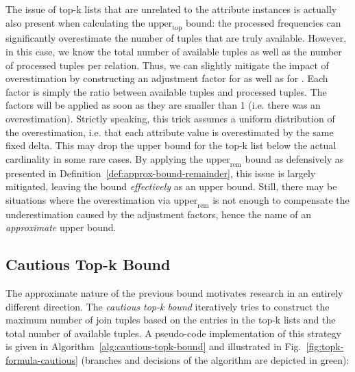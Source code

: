 The issue of top-k lists that are unrelated to the attribute instances is actually also present when calculating the $\text{upper}_\text{top}$ bound: the processed frequencies can significantly overestimate the number of tuples that are truly available. 
However, in this case, we know the total number of available tuples as well as the number of processed tuples per relation. 
Thus, we can slightly mitigate the impact of overestimation by constructing an adjustment factor for  as well as for . 
Each factor is simply the ratio between available tuples and processed tuples. 
The factors will be applied as soon as they are smaller than 1 (i.e. there was an overestimation). 
Strictly speaking, this trick assumes a uniform distribution of the overestimation, i.e. that each attribute value is overestimated by the same fixed delta. 
This may drop the upper bound for the top-k list below the actual cardinality in some rare cases. 
By applying the $\text{upper}_\text{rem}$ bound as defensively as presented in Definition~\ref{def:approx-bound-remainder}, this issue is largely mitigated, leaving the bound \emph{effectively} as an upper bound. 
Still, there may be situations where the overestimation via $\text{upper}_\text{rem}$ is not enough to compensate the underestimation caused by the adjustment factors, hence the name of an \emph{approximate} upper bound.

\subsection{Cautious Top-k Bound}
\label{sec:tighter-bounds-cautious}

The approximate nature of the previous bound motivates research in an entirely different direction. 
The \emph{cautious top-k bound} iteratively tries to construct the maximum number of join tuples based on the entries in the top-k lists and the total number of available tuples. A pseudo-code implementation of this strategy is given in Algorithm~\ref{alg:cautious-topk-bound} and illustrated in Fig.~\ref{fig:topk-formula-cautious} (branches and decisions of the algorithm are depicted in green):

